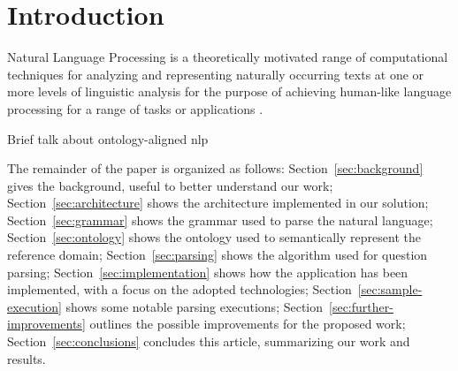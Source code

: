 \section{Introduction}
\label{sec:introduction}

Natural Language Processing is a theoretically motivated range of
computational techniques for analyzing and representing naturally occurring texts
at one or more levels of linguistic analysis for the purpose of achieving human-like
language processing for a range of tasks or applications \cite{liddy2001natural}.

Brief talk about ontology-aligned nlp\cite{cimiano2014ontology}

The remainder of the paper is organized as follows:
Section~\ref{sec:background} gives the background, useful to better understand our work;
Section~\ref{sec:architecture} shows the architecture implemented in our solution;
Section~\ref{sec:grammar} shows the grammar used to parse the natural language;
Section~\ref{sec:ontology} shows the ontology used to semantically represent the reference domain;
Section~\ref{sec:parsing} shows the algorithm used for question parsing;
Section~\ref{sec:implementation} shows how the application has been implemented, with a focus on the adopted technologies;
Section~\ref{sec:sample-execution} shows some notable parsing executions;
Section~\ref{sec:further-improvements} outlines the possible improvements for the proposed work;
Section~\ref{sec:conclusions} concludes this article, summarizing our work and results.
